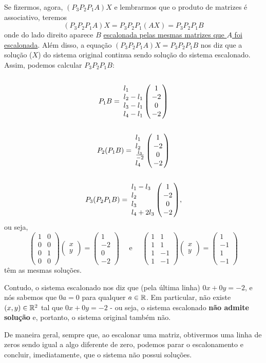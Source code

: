 \begin{ex}
	Se fizermos, agora, $(P_3P_2P_1A)X$ e lembrarmos que o produto de matrizes é associativo, teremos
	\[(P_3P_2P_1A)X=P_3P_2P_1(AX)=P_3P_2P_1B\]onde do lado direito aparece $B$ \underline{escalonada pelas mesmas matrizes que $A$ foi escalonada}. Além disso, a equação $(P_3P_2P_1A)X=P_3P_2P_1B$ nos diz que a solução ($X$) do sistema original continua sendo solução do sistema escalonado. Assim, podemos calcular $P_3P_2P_1B$:
	\[P_1B=\bordermatrix{&\cr l_1&1\cr l_2-l_1&-2\cr l_3-l_1&0\cr l_4-l_1&-2}
	\]
	\[P_2(P_1B)=\bordermatrix{&\cr l_1&1\cr l_2&-2\cr \frac{l_3}{-2}&0\cr l_4&-2}
	\]
	\[P_3(P_2P_1B)=\bordermatrix{&\cr l_1-l_3&1\cr l_2&-2\cr l_3&0\cr l_4+2l_3&-2},\]ou seja,
	\[\begin{pmatrix}
	1&0\\0&0\\0&1\\0&0
	\end{pmatrix}\begin{pmatrix}
	x\\y
	\end{pmatrix}=\begin{pmatrix}
	1\\-2\\0\\-2
	\end{pmatrix}\quad\text{ e }\quad\begin{pmatrix}
	1&1\\1&1\\1&-1\\1&-1
	\end{pmatrix}\begin{pmatrix}
	x\\y
	\end{pmatrix}=\begin{pmatrix}
	1\\-1\\1\\-1
	\end{pmatrix}\]têm as mesmas soluções.
	
	Contudo, o sistema escalonado nos diz que (pela última linha) $0x+0y=-2$, e nós sabemos que $0a=0$ para qualquer $a\in \mathbb R$. Em particular, não existe $(x,y)\in \mathbb R^2$ tal que $0x+0y=-2$ - ou seja, o sistema escalonado \textbf{não admite solução} e, portanto, o sistema original também não.
\end{ex}

\begin{rmk}
	De maneira geral, sempre que, ao escalonar uma matriz, obtivermos uma linha de zeros sendo igual a algo diferente de zero, podemos parar o escalonamento e concluir, imediatamente, que o sistema não possui soluções.
\end{rmk}

